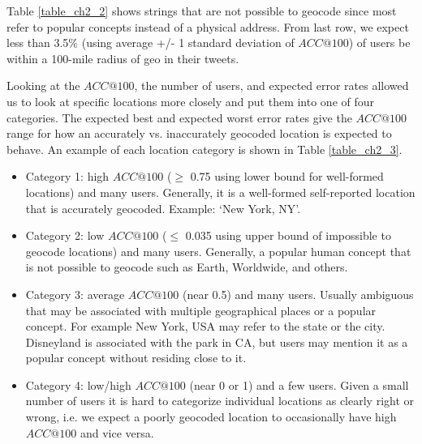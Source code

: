 Table \ref{table_ch2_2} shows strings that are not possible to geocode since most refer to popular concepts instead of a physical address. From last row, we expect less than 3.5\% (using average +/- 1 standard deviation of $ACC@100$) of users be within a 100-mile radius of geo in their tweets.

Looking at the $ACC@100$, the number of users, and expected error rates allowed us to look at specific locations more closely and put them into one of four categories. 
The expected best and expected worst error rates give the $ACC@100$ range for how an accurately vs. inaccurately geocoded location is expected to behave. An example of each location category is shown in Table \ref{table_ch2_3}.

\begin{itemize}
\item Category 1: high $ACC@100$ ($\geq$ 0.75 using lower bound for well-formed locations) and many users. Generally, it is a well-formed self-reported location that is accurately geocoded. Example: `New York, NY'.  

\item Category 2: low $ACC@100$ ($\leq$ 0.035 using upper bound of impossible to geocode locations) and many users. Generally, a popular human concept that is not possible to geocode such as Earth, Worldwide, and others. 

\item Category 3: average $ACC@100$ (near 0.5) and many users. Usually ambiguous that may be associated with multiple geographical places or a popular concept. For example New York, USA may refer to the state or the city. Disneyland is associated with the park in CA, but users may mention it as a popular concept without residing close to it. 

\item Category 4: low/high $ACC@100$ (near 0 or 1) and a few users. Given a small number of users it is hard to categorize individual locations as clearly right or wrong, i.e. we expect a poorly geocoded location to occasionally have high $ACC@100$ and vice versa.
\end{itemize}

